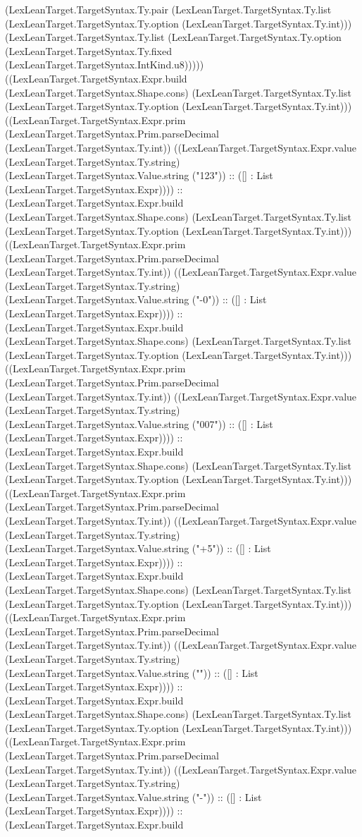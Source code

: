 \documentclass[11pt]{article}
\begin{document}
(LexLeanTarget.TargetSyntax.Ty.pair (LexLeanTarget.TargetSyntax.Ty.list (LexLeanTarget.TargetSyntax.Ty.option (LexLeanTarget.TargetSyntax.Ty.int))) (LexLeanTarget.TargetSyntax.Ty.list (LexLeanTarget.TargetSyntax.Ty.option (LexLeanTarget.TargetSyntax.Ty.fixed (LexLeanTarget.TargetSyntax.IntKind.u8))))) ((LexLeanTarget.TargetSyntax.Expr.build (LexLeanTarget.TargetSyntax.Shape.cons) (LexLeanTarget.TargetSyntax.Ty.list (LexLeanTarget.TargetSyntax.Ty.option (LexLeanTarget.TargetSyntax.Ty.int))) ((LexLeanTarget.TargetSyntax.Expr.prim (LexLeanTarget.TargetSyntax.Prim.parseDecimal (LexLeanTarget.TargetSyntax.Ty.int)) ((LexLeanTarget.TargetSyntax.Expr.value (LexLeanTarget.TargetSyntax.Ty.string) (LexLeanTarget.TargetSyntax.Value.string ("123")) :: ([] : List (LexLeanTarget.TargetSyntax.Expr)))) :: (LexLeanTarget.TargetSyntax.Expr.build (LexLeanTarget.TargetSyntax.Shape.cons) (LexLeanTarget.TargetSyntax.Ty.list (LexLeanTarget.TargetSyntax.Ty.option (LexLeanTarget.TargetSyntax.Ty.int))) ((LexLeanTarget.TargetSyntax.Expr.prim (LexLeanTarget.TargetSyntax.Prim.parseDecimal (LexLeanTarget.TargetSyntax.Ty.int)) ((LexLeanTarget.TargetSyntax.Expr.value (LexLeanTarget.TargetSyntax.Ty.string) (LexLeanTarget.TargetSyntax.Value.string ("-0")) :: ([] : List (LexLeanTarget.TargetSyntax.Expr)))) :: (LexLeanTarget.TargetSyntax.Expr.build (LexLeanTarget.TargetSyntax.Shape.cons) (LexLeanTarget.TargetSyntax.Ty.list (LexLeanTarget.TargetSyntax.Ty.option (LexLeanTarget.TargetSyntax.Ty.int))) ((LexLeanTarget.TargetSyntax.Expr.prim (LexLeanTarget.TargetSyntax.Prim.parseDecimal (LexLeanTarget.TargetSyntax.Ty.int)) ((LexLeanTarget.TargetSyntax.Expr.value (LexLeanTarget.TargetSyntax.Ty.string) (LexLeanTarget.TargetSyntax.Value.string ("007")) :: ([] : List (LexLeanTarget.TargetSyntax.Expr)))) :: (LexLeanTarget.TargetSyntax.Expr.build (LexLeanTarget.TargetSyntax.Shape.cons) (LexLeanTarget.TargetSyntax.Ty.list (LexLeanTarget.TargetSyntax.Ty.option (LexLeanTarget.TargetSyntax.Ty.int))) ((LexLeanTarget.TargetSyntax.Expr.prim (LexLeanTarget.TargetSyntax.Prim.parseDecimal (LexLeanTarget.TargetSyntax.Ty.int)) ((LexLeanTarget.TargetSyntax.Expr.value (LexLeanTarget.TargetSyntax.Ty.string) (LexLeanTarget.TargetSyntax.Value.string ("+5")) :: ([] : List (LexLeanTarget.TargetSyntax.Expr)))) :: (LexLeanTarget.TargetSyntax.Expr.build (LexLeanTarget.TargetSyntax.Shape.cons) (LexLeanTarget.TargetSyntax.Ty.list (LexLeanTarget.TargetSyntax.Ty.option (LexLeanTarget.TargetSyntax.Ty.int))) ((LexLeanTarget.TargetSyntax.Expr.prim (LexLeanTarget.TargetSyntax.Prim.parseDecimal (LexLeanTarget.TargetSyntax.Ty.int)) ((LexLeanTarget.TargetSyntax.Expr.value (LexLeanTarget.TargetSyntax.Ty.string) (LexLeanTarget.TargetSyntax.Value.string ("")) :: ([] : List (LexLeanTarget.TargetSyntax.Expr)))) :: (LexLeanTarget.TargetSyntax.Expr.build (LexLeanTarget.TargetSyntax.Shape.cons) (LexLeanTarget.TargetSyntax.Ty.list (LexLeanTarget.TargetSyntax.Ty.option (LexLeanTarget.TargetSyntax.Ty.int))) ((LexLeanTarget.TargetSyntax.Expr.prim (LexLeanTarget.TargetSyntax.Prim.parseDecimal (LexLeanTarget.TargetSyntax.Ty.int)) ((LexLeanTarget.TargetSyntax.Expr.value (LexLeanTarget.TargetSyntax.Ty.string) (LexLeanTarget.TargetSyntax.Value.string ("-")) :: ([] : List (LexLeanTarget.TargetSyntax.Expr)))) :: (LexLeanTarget.TargetSyntax.Expr.build 
\end{document}
